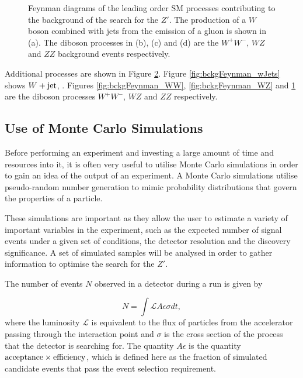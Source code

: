 \documentclass{article}
\begin{document}
\begin{figure}[htb]
\begin{subfigure}{.25\textwidth}
        \caption{}
        \label{fig:bckgFeynman_ZZ}
    \end{subfigure}
    \caption{Feynman diagrams of the leading order SM processes contributing to the background of the search for the $Z'$. The production of a $W$ boson combined with jets from the emission of a gluon is shown in (a). The diboson processes in (b), (c) and (d) are the $W^+W^-$, $WZ$ and $ZZ$ background events respectively.\label{fig:bckgFeynman}}
\end{figure}

Additional processes are shown in Figure \ref{fig:bckgFeynman}. Figure \ref{fig:bckgFeynman_wJets} shows $W+\rm{jet}$, . Figures \ref{fig:bckgFeynman_WW}, \ref{fig:bckgFeynman_WZ} and \ref{fig:bckgFeynman_ZZ} are the diboson processes $W^+W^-$, $WZ$ and $ZZ$ respectively.

\subsection{Use of Monte Carlo Simulations}%
\label{sec:study_MCS}
Before performing an experiment and investing a large amount of time and resources into it, it is often very useful to utilise Monte Carlo simulations in order to gain an idea of the output of an experiment. A Monte Carlo simulations utilise pseudo-random number generation to mimic probability distributions that govern the properties of a particle.

These simulations are important as they allow the user to estimate a variety of important variables in the experiment, such as the expected number of signal events under a given set of conditions, the detector resolution and the discovery significance. A set of simulated samples will be analysed in order to gather information to optimise the search for the $Z'$. 

The number of events $N$ observed in a detector during a run is given by

\begin{equation}
N = \int \mathcal{L}A\epsilon\sigma dt ,
\end{equation}
where the luminosity $\mathcal{L}$ is equivalent to the flux of particles from the accelerator passing through the interaction point and $\sigma$ is the cross section of the process that the detector is searching for. The quantity $A\epsilon$ is the quantity $\rm{acceptance} \times \rm{efficiency}$, which is defined here as the fraction of simulated candidate events that pass the event selection requirement.
\end{document}
